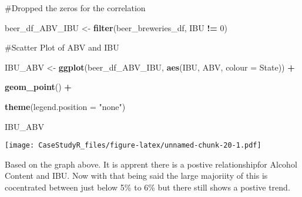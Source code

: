 \documentclass[
]{article}
\newenvironment{Shaded}{\begin{snugshade}}{\end{snugshade}}
\newcommand{\DataTypeTok}[1]{\textcolor[rgb]{0.13,0.29,0.53}{#1}}
\newcommand{\DecValTok}[1]{\textcolor[rgb]{0.00,0.00,0.81}{#1}}
\newcommand{\KeywordTok}[1]{\textcolor[rgb]{0.13,0.29,0.53}{\textbf{#1}}}
\newcommand{\NormalTok}[1]{#1}
\newcommand{\OperatorTok}[1]{\textcolor[rgb]{0.81,0.36,0.00}{\textbf{#1}}}
\newcommand{\StringTok}[1]{\textcolor[rgb]{0.31,0.60,0.02}{#1}}
\begin{document}
\#Dropped the zeros for the correlation

\begin{Shaded}
\begin{Highlighting}[]
\NormalTok{beer_df_ABV_IBU <-}\StringTok{ }\KeywordTok{filter}\NormalTok{(beer_breweries_df, IBU }\OperatorTok{!=}\StringTok{ }\DecValTok{0}\NormalTok{)}
\end{Highlighting}
\end{Shaded}

\#Scatter Plot of ABV and IBU

\begin{Shaded}
\begin{Highlighting}[]
\NormalTok{IBU_ABV <-}\StringTok{ }\KeywordTok{ggplot}\NormalTok{(beer_df_ABV_IBU, }\KeywordTok{aes}\NormalTok{(IBU, ABV, }\DataTypeTok{colour =}\NormalTok{ State)) }\OperatorTok{+}\StringTok{ }

\StringTok{  }\KeywordTok{geom_point}\NormalTok{() }\OperatorTok{+}\StringTok{ }

\StringTok{  }\KeywordTok{theme}\NormalTok{(}\DataTypeTok{legend.position =} \StringTok{"none"}\NormalTok{) }

\NormalTok{IBU_ABV }
\end{Highlighting}
\end{Shaded}

\texttt{[image: CaseStudyR\_files/figure-latex/unnamed-chunk-20-1.pdf]}

Based on the graph above. It is apprent there is a postive
relationshipfor Alcohol Content and IBU. Now with that being said the
large majoriity of this is cocentrated between just below 5\% to 6\% but
there still shows a postive trend.

\begin{Shaded}
\end{Shaded}
\end{document}
